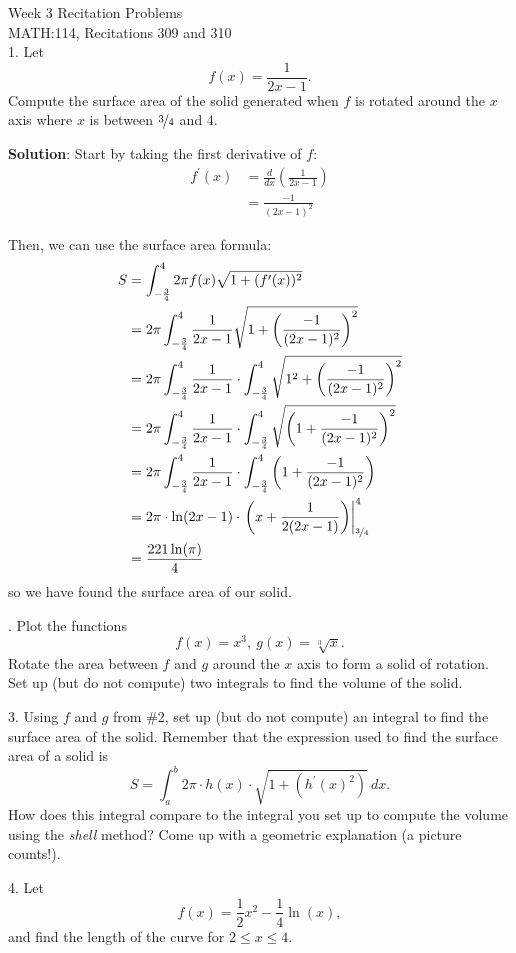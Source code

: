 \documentclass[11pt]{article}
\newcommand{\pp}[1]{#1^{\prime}}
\begin{document}
	\thispagestyle{empty}
	{
		\centering
		\huge{Week 3 Recitation Problems} \\
		\Large{MATH:114, Recitations 309 and 310} \\
	}
	\vspace{3em}
	1. Let $$f(x) = \frac{1}{2x-1}.$$ Compute the surface area of the solid generated when $f$ is rotated around the $x$ axis where $x$ is between $\nicefrac 34$ and $4$.
	
	\textbf{Solution}: Start by taking the first derivative of $f$:
	\begin{align*}
		\pp f(x) &= \frac{d}{dx}\left(\frac{1}{2x-1}\right) \\
		&= \frac{-1}{(2x-1)^2}
	\end{align*}
	
	Then, we can use the surface area formula:
	\begin{align*}
		S &= \int_{-\frac 34}^4 2\pi f(x) \sqrt{1 + (\pp f(x))^2} \\
		&= 2\pi \int_{-\frac 34}^4 \frac{1}{2x-1} \sqrt{1 + \left(\frac{-1}{(2x-1)^2}\right)^2} \\
		&= 2\pi \int_{-\frac 34}^4 \frac{1}{2x-1} \cdot \int_{-\frac 34}^4 \sqrt{1^2 + \left(\frac{-1}{(2x-1)^2}\right)^2} \\
		&= 2\pi \int_{-\frac 34}^4 \frac{1}{2x-1} \cdot \int_{-\frac 34}^4 \sqrt{\left(1 + \frac{-1}{(2x-1)^2}\right)^2} \\
		&= 2\pi \int_{-\frac 34}^4 \frac{1}{2x-1} \cdot \int_{-\frac 34}^4\left(1 + \frac{-1}{(2x-1)^2}\right) \\
		&= 2\pi \cdot \ln(2x-1) \cdot \left. \left(x + \frac{1}{2(2x-1)}\right)\right\rvert^4_{\nicefrac 34} \\
		&= \frac{221 \ln(\pi)}{4}
	\end{align*}
	so we have found the surface area of our solid.
	
	. Plot the functions $$ f(x) =x^3, \ g(x) = \sqrt[3]{x}.$$ Rotate the area between $f$ and $g$ around the $x$ axis to form a solid of rotation. Set up (but do not compute) two integrals to find the volume of the solid.
	
	\vspace{15em}
	
	3. Using $f$ and $g$ from \#2, set up (but do not compute) an integral to find the surface area of the solid. Remember that the expression used to find the surface area of a solid is $$S = \int_a^b 2\pi \cdot h(x) \cdot \sqrt{1 + (\pp h(x)^2)}\ dx.$$ How does this integral compare to the integral you set up to compute the volume using the \textit{shell} method? Come up with a geometric explanation (a picture counts!).

	
	\vspace{15em}
	
	4. Let $$f(x) = \frac 12 x^2 - \frac14 \ln (x),$$ and find the length of the curve for $2 \leq x \leq 4$.
	
\end{document}
